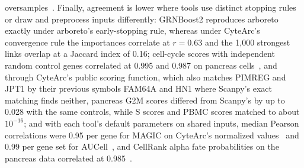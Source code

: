 oversamples~\cite{cusanovich2018cisregulatory,halko2011finding}. Finally, agreement is lower where tools use distinct stopping rules or draw and preprocess inputs differently: GRNBoost2 reproduces arboreto~\cite{moerman2018grnboost2} exactly under arboreto's early-stopping rule, whereas under CyteArc's convergence rule the importances correlate at $r = 0.63$ and the 1,000 strongest links overlap at a Jaccard index of 0.16; cell-cycle scores with independent random control genes correlated at 0.995 and 0.987 on pancreas cells~\cite{bastidas2019}, and through CyteArc's public scoring function, which also matches PIMREG and JPT1 by their previous symbols FAM64A and HN1 where Scanpy's exact matching finds neither, pancreas G2M scores differed from Scanpy's by up to 0.028 with the same controls, while S scores and PBMC scores matched to about $10^{-16}$; and with each tool's default parameters on shared inputs, median Pearson correlations were 0.95 per gene for MAGIC on CyteArc's normalized values~\cite{vandijk2018magic} and 0.99 per gene set for AUCell~\cite{aibar2017scenic}, and CellRank alpha fate probabilities on the pancreas data correlated at 0.985~\cite{weiler2024}.

\label{note:Reduction, clustering and marker checks}

